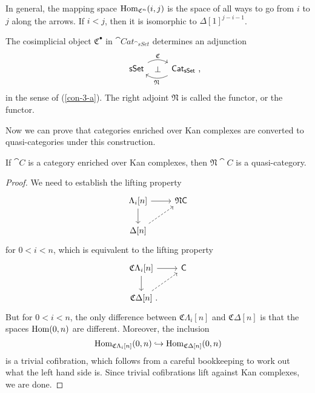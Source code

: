 In general, the mapping space $\operatorname{Hom}_{\mathfrak C^n}(i,j)$
is the space of all ways to go from $i$ to $j$ along the arrows.
If $i<j$, then it is isomorphic to $\Delta{[1]}^{j-i-1}$. 

\begin{definition}
    The cosimplicial object $\mathfrak C^\bullet$ in $\cat{Cat}_{\cat{sSet}}$
    determines an adjunction
    \[\begin{tikzcd}
        \cat{sSet}\ar[r,bend left,"\mathfrak C"]\ar[r,phantom,"\bot"] &
        \rlap{$\cat{Cat}_{\cat{sSet}}$\ ,}\phantom{\cat{sSet}}\ar[l,bend left,"\mathfrak N"]
    \end{tikzcd}\]
    in the sense of \textup{(\ref{con-3-a})}.
    The right adjoint $\mathfrak N$ is called the  functor,
    or the  functor.
\end{definition}

Now we can prove that categories enriched over Kan complexes 
are converted to quasi-categories under this construction.

\begin{proposition}
    If $\cat C$ is a category enriched over Kan complexes,
    then $\mathfrak N\cat C$ is a quasi-category.
\end{proposition}

\begin{proof}
    We need to establish the lifting property
    \[ \begin{tikzcd}
        \Lambda_i[n] \ar[d] \ar[r] & \mathfrak{N}\cat{C} \\
        \Delta[n] \ar[ur,dashed]
    \end{tikzcd} \]
    for $0<i<n$, which is equivalent to the lifting property 
    \[ \begin{tikzcd}
        \mathfrak{C}\Lambda_i[n] \ar[d] \ar[r] & \cat{C} \\
        \mathfrak{C}\Delta[n] \rlap{\ .} \ar[ur,dashed]
    \end{tikzcd} \]
    But for $0<i<n$, the only difference between $\mathfrak{C}\Lambda_i[n]$ and $\mathfrak{C}\Delta[n]$
    is that the spaces $\operatorname{Hom}(0,n)$ are different. Moreover, the inclusion
    \[ \operatorname{Hom}_{\mathfrak{C}\Lambda_i[n]}(0,n) \hookrightarrow \operatorname{Hom}_{\mathfrak{C}\Delta[n]}(0,n) \]
    is a trivial cofibration,
    which follows from a careful bookkeeping to work out what the left hand side is.
    Since trivial cofibrations lift against Kan complexes, we are done.
\end{proof}

